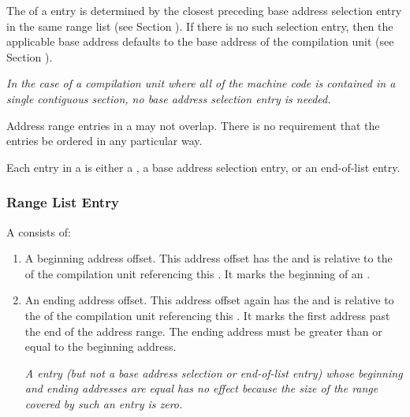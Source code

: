 \bbpareb

The  of a  
entry is determined by the closest preceding base address 
selection entry in the same range list (see
\bb
Section ). 
\eb
 If there is no such selection
entry, then the applicable base address defaults to the base
address of the compilation unit 
(see Section ).

\textit{In the case of a compilation unit where all of the machine
code is contained in a single contiguous section, no base
address selection entry is needed.}

Address range entries in a  may not overlap.
There is no requirement that the entries be ordered in any particular way.

Each entry in a  is either a 
,
a base address selection entry, or an 
end-of-list entry.

\subsubsection{Range List Entry}
A  consists of:
\begin{enumerate}[1. ]
\item A beginning address offset. This address offset has the 
 and is relative to
the  of the compilation unit referencing this 
. 
It marks the beginning of an 
. 

\item An ending address offset. This address offset again has the 
 and is relative
to the  of the compilation unit referencing 
this .
It marks the first address past the end of the address range.
The ending address must be greater than or
equal to the beginning address.

\textit{A  entry (but not a base address 
selection or end-of-list entry) whose beginning and
ending addresses are equal has no effect because the size of the 
range covered by such an entry is zero.}
\end{enumerate}

